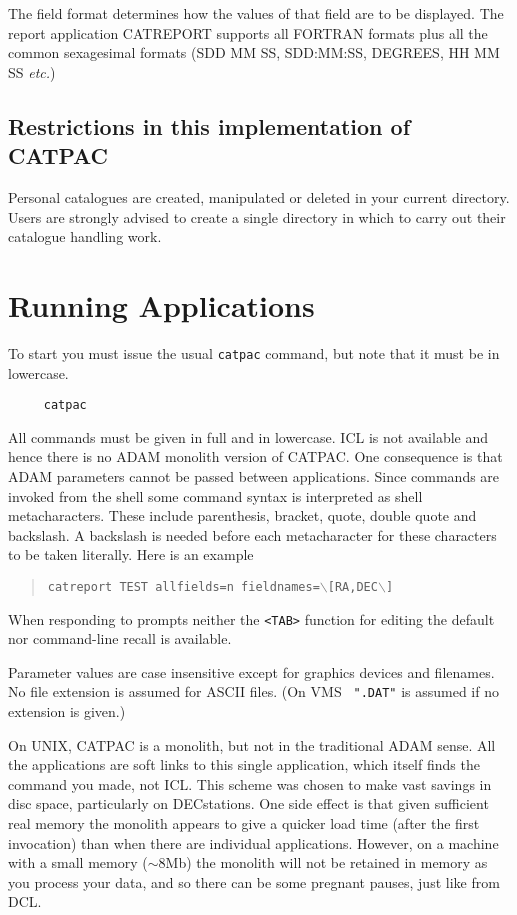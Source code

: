 The field format determines how the values of that field are to be displayed.
The report application CATREPORT supports all FORTRAN formats plus all the 
common sexagesimal formats (SDD MM SS, SDD:MM:SS, DEGREES, HH MM SS 
{\em etc.})

\subsection {Restrictions in this implementation of CATPAC}

Personal catalogues are created, manipulated or deleted in your current
directory. Users are strongly advised to create a single directory in which to
carry out their catalogue handling work.


\section{Running Applications}

To start you must issue the usual {\tt catpac} command, but note that
it must be in lowercase.

\begin{verbatim}
     catpac
\end{verbatim}

All commands must be given in full and in lowercase.  {\sc ICL} is
not available and hence there is no {\sc ADAM} monolith version of
{\sc CATPAC}.  One consequence is that {\sc ADAM} parameters cannot
be passed between applications.  Since commands are invoked from the
shell some command syntax is interpreted as shell metacharacters.  These
include parenthesis, bracket, quote, double quote and backslash.  A
backslash is needed before each metacharacter for these characters to be
taken literally.  Here is an example

\begin{quote}
{\tt catreport TEST allfields=n fieldnames=$\backslash$[RA,DEC$\backslash$]}
\end{quote}

When responding to prompts neither the {\tt <TAB>} function for editing
the default nor command-line recall is available.

Parameter values are case insensitive except for graphics devices and
filenames.  No file extension is assumed for ASCII files. (On VMS {\tt
".DAT"} is assumed if no extension is given.) 

On UNIX, {\sc CATPAC} is a monolith, but not in the traditional
{\sc ADAM} sense. All the applications are soft links to this single
application, which itself finds the command you made, not {\sc ICL}.  This
scheme was chosen to make vast savings in disc space, particularly on
DECstations. One side effect is that given sufficient real memory the
monolith appears to give a quicker load time (after the first
invocation) than when there are individual applications. However, on a
machine with a small memory ($\sim$8Mb) the monolith will not be
retained in memory as you process your data, and so there can be some
pregnant pauses, just like from {\sc DCL}. 

